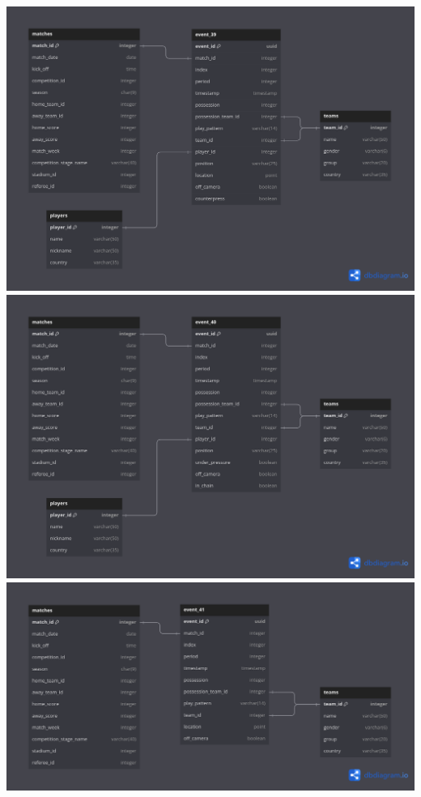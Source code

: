 \documentclass[12pt]{article}
\begin{document}
\includegraphics[width=\textwidth]{schema-diagram/event_39.png}
\includegraphics[width=\textwidth]{schema-diagram/event_40.png}
\includegraphics[width=\textwidth]{schema-diagram/event_41.png}
\end{document}
